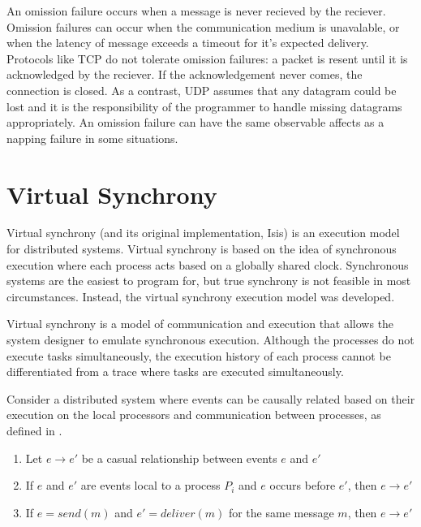 An omission failure occurs when a message is never recieved by the reciever. Omission failures can occur when the communication medium is unavalable,
or when the latency of message exceeds a timeout for it's expected delivery. Protocols like TCP do not tolerate omission failures: a packet is resent until
it is acknowledged by the reciever. If the acknowledgement never comes, the connection is closed. As a contrast, UDP assumes that any datagram could be lost
and it is the responsibility of the programmer to handle missing datagrams appropriately. An omission failure can have the same observable affects as a napping
failure in some situations. \cite{DISTRIBUTED}

\section{Virtual Synchrony}
Virtual synchrony (and its original implementation, Isis\cite{ISISTOOLKIT}) is an execution model for distributed systems. Virtual synchrony is based on the idea of synchronous execution where each process acts based on a globally shared clock. Synchronous systems are the easiest to program for, but true synchrony is not feasible in most circumstances. Instead, the virtual synchrony execution model was developed. 

Virtual synchrony is a model of communication and execution that allows the system designer to emulate synchronous execution. Although the processes do not execute tasks simultaneously, the execution history of each process cannot be differentiated from a trace where tasks are executed simultaneously. 

Consider a distributed system where events can be causally related based on their execution on the local processors and communication between processes, as defined in \cite[p~.101]{ISISTOOLKIT}. 

\begin{enumerate}
	\item Let $e \rightarrow e'$ be a casual relationship between events $e$ and $e'$
    \item If $e$ and $e'$ are events local to a process $P_{i}$ and $e$ occurs before $e'$, then $e \rightarrow e'$
    \item If $e = send(m)$ and $e'=deliver(m)$ for the same message $m$, then $e \rightarrow e'$
\end{enumerate}


